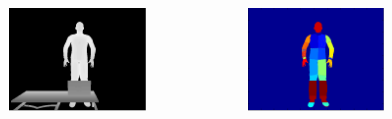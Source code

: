 \documentclass[xcolor=dvipsnames]{beamer}
\begin{document}
\begin{frame}
\begin{columns}
\begin{column}{.33\textwidth}
\begin{figure}
			\end{figure}
		\end{column}
		\begin{column}{.33\textwidth}
			\begin{figure}
				\includegraphics[width=\textwidth]{img/oarf2.png}
			\end{figure}
		\end{column}
		\begin{column}{.33\textwidth}
			\begin{figure}
				\includegraphics[width=\textwidth]{img/oarf3.png}
			\end{figure}
		\end{column}
	\end{columns}
\end{frame}
\end{document}
